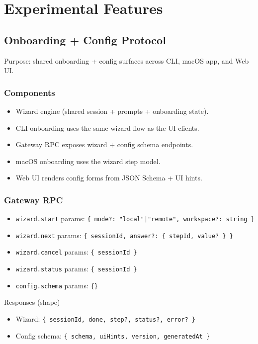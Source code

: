\chapter{Experimental Features}

\section{Onboarding + Config Protocol}


Purpose: shared onboarding + config surfaces across CLI, macOS app, and Web UI.

\subsection{Components}


\begin{itemize}
  \item Wizard engine (shared session + prompts + onboarding state).
  \item CLI onboarding uses the same wizard flow as the UI clients.
  \item Gateway RPC exposes wizard + config schema endpoints.
  \item macOS onboarding uses the wizard step model.
  \item Web UI renders config forms from JSON Schema + UI hints.
\end{itemize}


\subsection{Gateway RPC}


\begin{itemize}
  \item \texttt{wizard.start} params: \texttt{\{ mode?: "local"|"remote", workspace?: string \}}
  \item \texttt{wizard.next} params: \texttt{\{ sessionId, answer?: \{ stepId, value? \} \}}
  \item \texttt{wizard.cancel} params: \texttt{\{ sessionId \}}
  \item \texttt{wizard.status} params: \texttt{\{ sessionId \}}
  \item \texttt{config.schema} params: \texttt{\{\}}
\end{itemize}


Responses (shape)

\begin{itemize}
  \item Wizard: \texttt{\{ sessionId, done, step?, status?, error? \}}
  \item Config schema: \texttt{\{ schema, uiHints, version, generatedAt \}}
\end{itemize}


